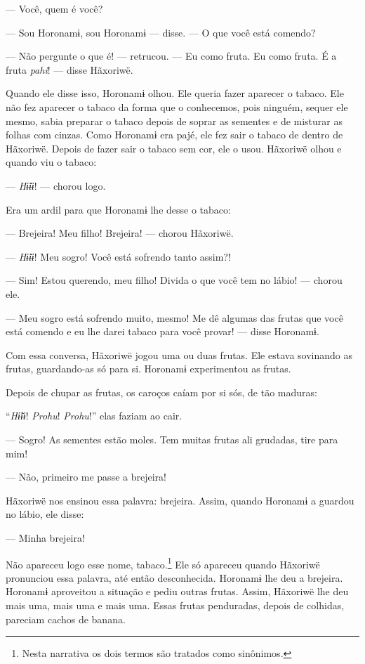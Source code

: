--- Você, quem é você?

--- Sou Horonamɨ, sou Horonamɨ --- disse. --- O que você está comendo? 

--- Não pergunte o que é! --- retrucou. --- Eu como fruta. Eu como
fruta. É a fruta \textit{pahi}! --- disse Hãxoriwë. 

Quando ele disse isso, Horonamɨ olhou. Ele queria fazer aparecer o
tabaco. Ele não fez aparecer o tabaco da forma que o conhecemos, pois
ninguém, sequer ele mesmo, sabia preparar o tabaco depois de soprar as
sementes e de misturar as folhas com cinzas. Como Horonamɨ era pajé, ele
fez sair o tabaco de dentro de Hãxoriwë. Depois de fazer sair o tabaco
sem cor, ele o usou. Hãxoriwë olhou e quando viu o tabaco: 

--- \textit{Hɨ̃ɨɨ}! --- chorou logo. 

Era um ardil para que Horonamɨ lhe desse o tabaco: 

--- Brejeira! Meu filho! Brejeira! --- chorou Hãxoriwë. 

--- \textit{Hɨ̃ɨɨ}! Meu sogro! Você está sofrendo tanto assim?! 

--- Sim! Estou querendo, meu filho! Divida o que você tem no
lábio! --- chorou ele.

--- Meu sogro está sofrendo muito, mesmo! Me dê algumas das frutas que
você está comendo e eu lhe darei tabaco para você provar! --- disse
Horonamɨ. 

Com essa conversa, Hãxoriwë jogou uma ou duas frutas. Ele estava
sovinando as frutas, guardando-as só para si. Horonamɨ experimentou as
frutas. 

Depois de chupar as frutas, os caroços caíam por si sós, de tão maduras:

``\textit{Hɨ̃ɨɨ}! \textit{Prohu}! \textit{Prohu}!'' elas faziam ao cair. 

--- Sogro! As sementes estão moles. Tem muitas frutas ali grudadas, tire
para mim! 

--- Não, primeiro me passe a brejeira! 

Hãxoriwë nos ensinou essa palavra: brejeira. Assim, quando Horonamɨ a
guardou no lábio, ele disse: 

--- Minha brejeira! 

Não apareceu logo esse nome, tabaco.\footnote{Nesta narrativa os dois termos 
são tratados como sinônimos.}  Ele só apareceu
quando Hãxoriwë pronunciou essa palavra, até então desconhecida.
Horonamɨ lhe deu a brejeira. Horonamɨ aproveitou a situação e pediu
outras frutas. Assim, Hãxoriwë lhe deu mais uma, mais uma e mais uma.
Essas frutas penduradas, depois de colhidas, pareciam cachos de banana. 

